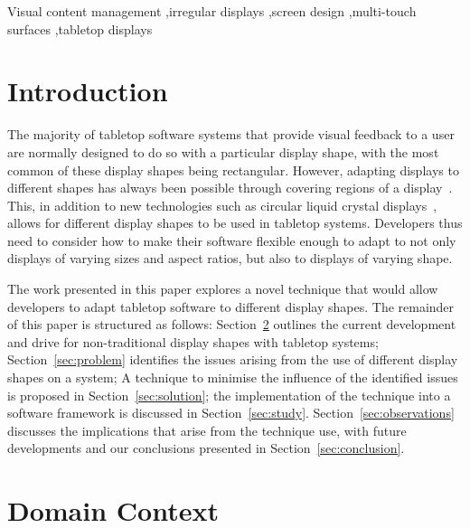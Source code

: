 \documentclass[review,5p,times,twocolumn]{elsarticle}
\begin{document}
\begin{frontmatter}
\begin{keyword}
Visual content management \sep irregular displays \sep screen design \sep multi-touch surfaces \sep tabletop displays
\end{keyword}


\end{frontmatter}

\section{Introduction}
\label{sec:intro}

The majority of tabletop software systems that provide visual feedback to a user are normally designed to do so with a particular display shape, with the most common of these display shapes being rectangular.
However, adapting displays to different shapes has always been possible through covering regions of a display~\cite{Dietz2004}.
This, in addition to new technologies such as circular liquid crystal displays~\cite{Boyd2007,Finney2009}, allows for different display shapes to be used in tabletop systems. 
Developers thus need to consider how to make their software flexible enough to adapt to not only displays of varying sizes and aspect ratios, but also to displays of varying shape.

The work presented in this paper explores a novel technique that would allow developers to adapt tabletop software to different display shapes.
The remainder of this paper is structured as follows: 
Section~\ref{sec:related} outlines the current development and drive for non-traditional display shapes with tabletop systems;
Section~\ref{sec:problem} identifies the issues arising from the use of different display shapes on a system;
A technique to minimise the influence of the identified issues is proposed in Section~\ref{sec:solution};
the implementation of the technique into a software framework is discussed in Section~\ref{sec:study}.
Section~\ref{sec:observations} discusses the implications that arise
from the technique use, with future developments and our conclusions presented in Section~\ref{sec:conclusion}.

\section{Domain Context}
\label{sec:related}
\end{document}
